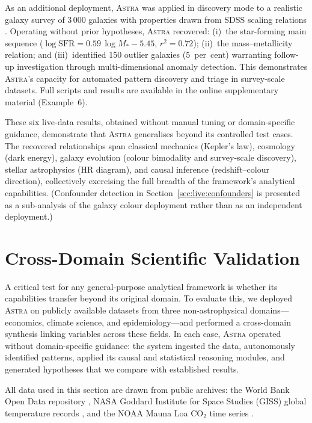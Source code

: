 \documentclass[usenatbib]{rasti}
\newcommand{\astra}{\textsc{Astra}\xspace}
\begin{document}
As an additional deployment, \astra was applied in discovery mode to a realistic galaxy survey of 3\,000 galaxies with properties drawn from SDSS scaling relations \citep{Elbaz2007,Mannucci2010}.
Operating without prior hypotheses, \astra recovered: (i)~the star-forming main sequence ($\log \mathrm{SFR} = 0.59\,\log M_* - 5.45$, $r^2 = 0.72$); (ii)~the mass--metallicity relation; and (iii)~identified 150 outlier galaxies ($5$~per~cent) warranting follow-up investigation through multi-dimensional anomaly detection.
This demonstrates \astra's capacity for automated pattern discovery and triage in survey-scale datasets.
Full scripts and results are available in the online supplementary material (Example~6).

\medskip

These six live-data results, obtained without manual tuning or domain-specific guidance, demonstrate that \astra generalises beyond its controlled test cases.
The recovered relationships span classical mechanics (Kepler's law), cosmology (dark energy), galaxy evolution (colour bimodality and survey-scale discovery), stellar astrophysics (HR diagram), and causal inference (redshift--colour direction), collectively exercising the full breadth of the framework's analytical capabilities.
(Confounder detection in Section~\ref{sec:live:confounders} is presented as a sub-analysis of the galaxy colour deployment rather than as an independent deployment.)

\section{Cross-Domain Scientific Validation}
\label{sec:crossdomain}

A critical test for any general-purpose analytical framework is whether its capabilities transfer beyond its original domain.
To evaluate this, we deployed \astra on publicly available datasets from three non-astrophysical domains---economics, climate science, and epidemiology---and performed a cross-domain synthesis linking variables across these fields.
In each case, \astra operated without domain-specific guidance: the system ingested the data, autonomously identified patterns, applied its causal and statistical reasoning modules, and generated hypotheses that we compare with established results.

All data used in this section are drawn from public archives: the World Bank Open Data repository \citep{WorldBank2024}, NASA Goddard Institute for Space Studies (GISS) global temperature records \citep{Hansen2010}, and the NOAA Mauna Loa CO$_{2}$ time series \citep{NOAA2024}.
\end{document}
